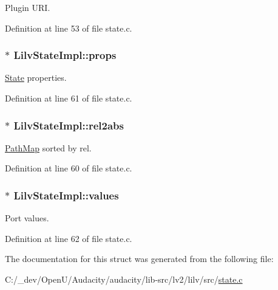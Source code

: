 Plugin U\+RI. 



Definition at line 53 of file state.\+c.

\subsubsection[{\texorpdfstring{props}{props}}]{$\ast$ Lilv\+State\+Impl\+::props}\hypertarget{struct_lilv_state_impl_aa747c21d631a7d83dd43ffb9ba50639a}{}\label{struct_lilv_state_impl_aa747c21d631a7d83dd43ffb9ba50639a}


\hyperlink{struct_state}{State} properties. 



Definition at line 61 of file state.\+c.

\subsubsection[{\texorpdfstring{rel2abs}{rel2abs}}]{$\ast$ Lilv\+State\+Impl\+::rel2abs}\hypertarget{struct_lilv_state_impl_a2aaa043ed8ba2b8d8688181fca7c999b}{}\label{struct_lilv_state_impl_a2aaa043ed8ba2b8d8688181fca7c999b}


\hyperlink{struct_path_map}{Path\+Map} sorted by rel. 



Definition at line 60 of file state.\+c.

\subsubsection[{\texorpdfstring{values}{values}}]{$\ast$ Lilv\+State\+Impl\+::values}\hypertarget{struct_lilv_state_impl_a3697bdf87d136bc6bf2e91d3772d6626}{}\label{struct_lilv_state_impl_a3697bdf87d136bc6bf2e91d3772d6626}


Port values. 



Definition at line 62 of file state.\+c.



The documentation for this struct was generated from the following file\+:\begin{DoxyCompactItemize}
\item 
C\+:/\+\_\+dev/\+Open\+U/\+Audacity/audacity/lib-\/src/lv2/lilv/src/\hyperlink{state_8c}{state.\+c}\end{DoxyCompactItemize}
